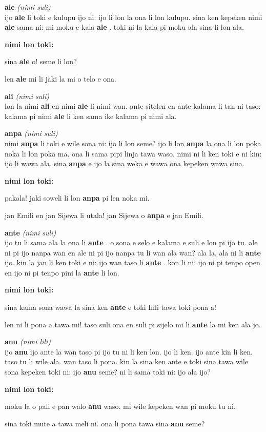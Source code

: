 \documentclass[a4paper,11pt]{book}
\newenvironment{definition}[2]{ %
  \begin{description}
  \item
    {\huge \textbf{#1}}
    {\Large \textit{(#2)}} \\
}{
  \end{description}%
}
\newenvironment{example}{ %
  \item
  \textbf{nimi lon toki:}
  
  \hfill
  \begin{minipage}{\dimexpr\textwidth-1cm}
  \begin{itshape}
}
{
  \end{itshape}
  \end{minipage}
}
\newcommand{\inex}[1]{%
  \textbf{#1}%
}
\begin{document}
\begin{definition}{ale}{nimi suli}
  ijo \inex{ale} li toki e kulupu ijo ni: ijo li lon la ona li lon kulupu. sina ken kepeken nimi \inex{ale} sama ni: mi moku e kala \inex{ale}. toki ni la kala pi moku ala sina li lon ala.
  \begin{example}
    sina \inex{ale} o! seme li lon?
    
    len \inex{ale} mi li jaki la mi o telo e ona.
  \end{example}
\end{definition}

\begin{definition}{ali}{nimi suli}
  lon la nimi \inex{ali} en nimi \inex{ale} li nimi wan. ante sitelen en ante kalama li tan ni taso: kalama pi nimi \inex{ale} li ken sama ike kalama pi nimi ala.
\end{definition}

\begin{definition}{anpa}{nimi suli}
  nimi \inex{anpa} li toki e wile sona ni: ijo li lon seme? ijo li lon \inex{anpa} la ona li lon poka noka li lon poka ma. ona li sama pipi linja tawa waso. nimi ni li ken toki e ni kin: ijo li wawa ala. sina \inex{anpa} e ijo la sina weka e wawa ona kepeken wawa sina.
  \begin{example}
    pakala! jaki soweli li lon \inex{anpa} pi len noka mi.
    
    jan Emili en jan Sijewa li utala! jan Sijewa o \inex{anpa} e jan Emili.
  \end{example}
\end{definition}

\begin{definition}{ante}{nimi suli}
  ijo tu li sama ala la ona li \inex{ante}. o sona e selo e kalama e suli e lon pi ijo tu. ale ni pi ijo nanpa wan en ale ni pi ijo nanpa tu li wan ala wan? ala la, ala ni li \inex{ante} ijo. kin la jan li ken toki e ni: ijo wan taso li \inex{ante}. kon li ni: ijo ni pi tenpo open en ijo ni pi tenpo pini la \inex{ante} li lon.
  \begin{example}
    sina kama sona wawa la sina ken \inex{ante} e toki Inli tawa toki pona a!
    
    len ni li pona a tawa mi! taso suli ona en suli pi sijelo mi li \inex{ante} la mi ken ala jo.
  \end{example}
\end{definition}

\pagebreak

\begin{definition}{anu}{nimi lili}
  ijo \inex{anu} ijo ante la wan taso pi ijo tu ni li ken lon. ijo li ken. ijo ante kin li ken. taso tu li wile ala. wan taso li pona. kin la sina ken ante e toki sina tawa wile sona kepeken toki ni: ijo \inex{anu} seme? ni li sama toki ni: ijo ala ijo?
  \begin{example}
    moku la o pali e pan walo \inex{anu} waso. mi wile kepeken wan pi moku tu ni.
    
    sina toki mute a tawa meli ni. ona li pona tawa sina \inex{anu} seme?
  \end{example}
\end{definition}
\end{document}
